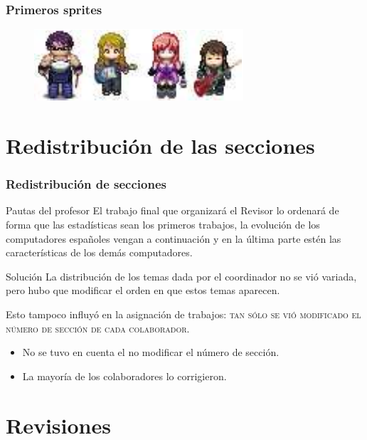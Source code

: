 \documentclass[9pt,xcolor=svgnames]{beamer}
\begin{document}
  \begin{frame}
    \frametitle{Primeros sprites}
    
     \begin{figure}[t]
      \centering
      \includegraphics[scale=1]{./Imagenes/grupo.pdf}    
      \end{figure}
  \end{frame}


  \section{Redistribución de las secciones}
    
  \begin{frame}
   \frametitle{Redistribución de secciones}
    \transboxin
 
    \begin{block}{Pautas del profesor}
     El trabajo final que organizará el Revisor lo ordenará de forma que las
     estadísticas sean los primeros trabajos, la evolución de los 
     computadores españoles vengan a continuación y en la última parte 
     estén las características de los demás computadores.
    \end{block}
  
  \begin{block}{Solución}
   La distribución de los temas dada por el coordinador no se vió variada, 
   pero hubo que modificar el orden en que estos temas aparecen.
  
   Esto tampoco influyó en la asignación de trabajos:
   \textsc{tan sólo se vió modificado el número de sección de cada 
   colaborador}.
  
   \begin{itemize}
     \item No se tuvo en cuenta el no modificar el número de sección.
     \item La mayoría de los colaboradores lo corrigieron.
   \end{itemize}
  \end{block}
  
  \end{frame}
 
  
  \section{Revisiones}
  
\end{document}
